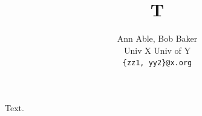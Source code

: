 \documentclass{article}
\begin{document}
\title{T}
\author{Ann Able, Bob Baker\\ Univ X \hspace{8pt} Univ of Y\\ \texttt{\{zz1, yy2\}@x.org}}
\maketitle
Text.
\end{document}
